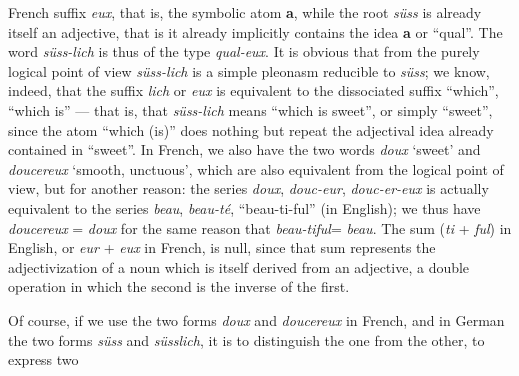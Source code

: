 \begin{sloppypar}
{   }
   {\noindent
     French suffix \emph{eux}, that is, the symbolic atom \textbf{a},
     while the root \emph{süss} is already itself an adjective, that
     is it already implicitly contains the idea \textbf{a} or
     ``qual''. The word \emph{süss-lich} is thus of the type
     \emph{qual-eux}. It is obvious that from the purely logical point
     of view \emph{süss-lich} is a simple pleonasm reducible to
     \emph{süss}; we know, indeed, that the suffix \emph{lich} or
     \emph{eux} is equivalent to the dissociated suffix ``which'',
     ``which is'' --- that is, that \emph{süss-lich} means ``which is
     sweet'', or simply ``sweet'', since the atom ``which (is)'' does
     nothing but repeat the adjectival idea already contained in
     ``sweet''. In French, we also have the two words \emph{doux}
     `sweet' and \emph{doucereux} `smooth, unctuous', which are also
     equivalent from the logical point of view, but for another
     reason: the series \emph{doux}, \emph{douc-eur},
     \emph{douc-er-eux} is actually equivalent to the series
     \emph{beau}, \emph{beau-té}, ``beau-ti-ful'' (in English); we
     thus have \emph{doucereux} = \emph{doux} for the same reason that
     \emph{beau-tiful}= \emph{beau}.  The sum (\emph{ti} + \emph{ful})
     in English, or \emph{eur} + \emph{eux} in French, is null, since
     that sum represents the adjectivization of a noun which is itself
     derived from an adjective, a double operation in which the second
     is the inverse of the first.

     Of course, if we use the two forms \emph{doux} and \emph{doucereux} in
     French, and in German the two forms \emph{süss} and
     \emph{süsslich}, it is to distinguish the one from the other, to
     express two
   
   }

\end{sloppypar}
